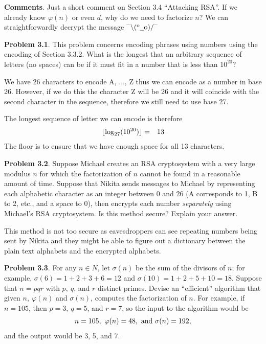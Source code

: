 \documentclass[aps,preprint,preprintnumbers,nofootinbib,showpacs,prd]{revtex4-1}
\newcommand{\nbea}{\begin{eqnarray*}}
\newcommand{\neea}{\end{eqnarray*}}
\newcommand{\dunno}{$ {}^{\mbox {--}}\backslash(^{\rm o}{}\underline{\hspace{0.2cm}}{\rm o})/^{\mbox {--}}$}
\DeclarePairedDelimiter{\floor}{\lfloor}{\rfloor}
\begin{document}
{\bf Comments}. Just a short comment on Section 3.4 ``Attacking RSA''. If we already know $\varphi(n)$ or even $d$, why do we need to factorize $n$? We can straightforwardly decrypt the message \dunno

{\bf Problem 3.1}. This problem concerns encoding phrases using numbers using the encoding of Section 3.3.2. What is the longest that an arbitrary sequence of letters (no spaces) can be if it must fit in a number that is less than $10^{20}$?

We have 26 characters to encode A, $\dots$, Z thus we can encode as a number in base 26. However, if we do this the character Z will be 26 and it will coincide with the second character in the sequence, therefore we still need to use base 27.

The longest sequence of letter we can encode is therefore
%
\nbea
\floor{\log_{27}(10^{20})} & = & 13
\neea
%
The floor is to ensure that we have enough space for all 13 characters.

{\bf Problem 3.2}. Suppose Michael creates an RSA cryptosystem with a very large modulus $n$ for which the factorization of $n$ cannot be found in a reasonable amount of time. Suppose that Nikita sends messages to Michael by representing each alphabetic character as an integer between 0 and 26 (A corresponds to 1, B to 2, etc., and a space to 0), then encrypts each number {\it separately} using Michael’s RSA cryptosystem. Is this method secure? Explain your answer.

This method is not too secure as eavesdroppers can see repeating numbers being sent by Nikita and they might be able to figure out a dictionary between the plain text alphabets and the encrypted alphabets.

{\bf Problem 3.3}. For any $n \in N$, let $\sigma(n)$ be the sum of the divisors of $n$; for example, $\sigma(6) = 1 + 2 + 3 + 6 = 12$ and $\sigma(10) = 1 + 2 + 5 + 10 = 18$. Suppose that $n = pqr$ with $p,~ q$, and $r$ distinct primes. Devise an ``efficient'' algorithm that given $n,~ \varphi(n)$ and $\sigma(n)$, computes the factorization of $n$. For example, if $n = 105$, then $p = 3,~ q = 5$, and $r = 7$, so the input to the algorithm would be
%
\nbea
n = 105,~ \varphi(n) = 48,~ {\rm and~} \sigma(n) = 192,
\neea
and the output would be 3, 5, and 7.
\end{document}
